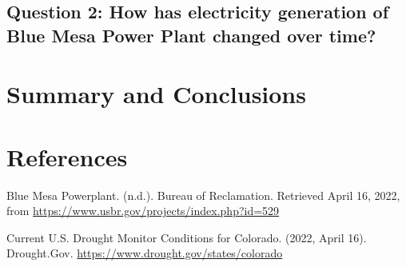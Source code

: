 \documentclass[
  12pt,
]{article}
\begin{document}
\hypertarget{question-2-how-has-electricity-generation-of-blue-mesa-power-plant-changed-over-time}{%
\subsection{Question 2: How has electricity generation of Blue Mesa
Power Plant changed over
time?}\label{question-2-how-has-electricity-generation-of-blue-mesa-power-plant-changed-over-time}}

\newpage

\hypertarget{summary-and-conclusions}{%
\section{Summary and Conclusions}\label{summary-and-conclusions}}

\newpage

\hypertarget{references}{%
\section{References}\label{references}}

Blue Mesa Powerplant. (n.d.). Bureau of Reclamation. Retrieved April 16,
2022, from \url{https://www.usbr.gov/projects/index.php?id=529}

Current U.S. Drought Monitor Conditions for Colorado. (2022, April 16).
Drought.Gov. \url{https://www.drought.gov/states/colorado}
\end{document}
